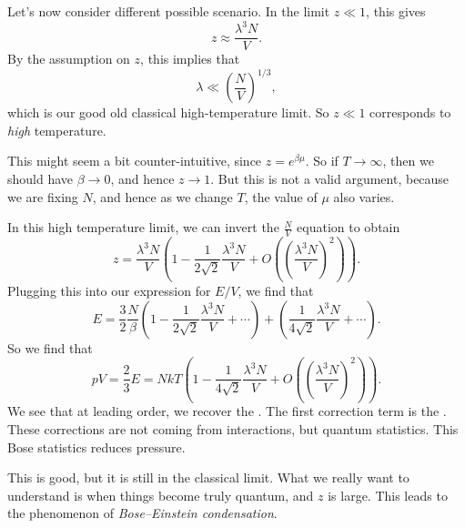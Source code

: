 \documentclass[a4paper]{article}
\begin{document}
Let's now consider different possible scenario. In the limit $z \ll 1$, this gives
\[
  z \approx \frac{\lambda^3 N}{V}.
\]
By the assumption on $z$, this implies that
\[
  \lambda \ll \left(\frac{N}{V}\right)^{1/3},
\]
which is our good old classical high-temperature limit. So $z \ll 1$ corresponds to \emph{high} temperature.

This might seem a bit counter-intuitive, since $z = e^{\beta \mu}$. So if $T \to \infty$, then we should have $\beta \to 0$, and hence $z \to 1$. But this is not a valid argument, because we are fixing $N$, and hence as we change $T$, the value of $\mu$ also varies.

In this high temperature limit, we can invert the $\frac{N}{V}$ equation to obtain
\[
  z = \frac{\lambda^3N}{V} \left(1 - \frac{1}{2\sqrt{2}} \frac{\lambda^3 N}{V} + O\left(\left(\frac{\lambda^3 N}{V}\right)^2\right)\right).
\]
Plugging this into our expression for $E/V$, we find that
\[
  E = \frac{3}{2} \frac{N}{\beta}\left(1 - \frac{1}{2\sqrt{2}} \frac{\lambda^3N}{V} + \cdots\right) + \left(\frac{1}{4\sqrt{2}} \frac{\lambda^3 N}{V} + \cdots\right).
\]
So we find that
\[
  pV = \frac{2}{3}E = NkT \left(1 - \frac{1}{4\sqrt{2}} \frac{\lambda^3 N}{V} + O\left(\left(\frac{\lambda^3N}{V}\right)^2\right)\right).
\]
We see that at leading order, we recover the . The first correction term is the . These corrections are not coming from interactions, but quantum statistics. This Bose statistics reduces pressure.

This is good, but it is still in the classical limit. What we really want to understand is when things become truly quantum, and $z$ is large. This leads to the phenomenon of \emph{Bose--Einstein condensation}.
\end{document}
